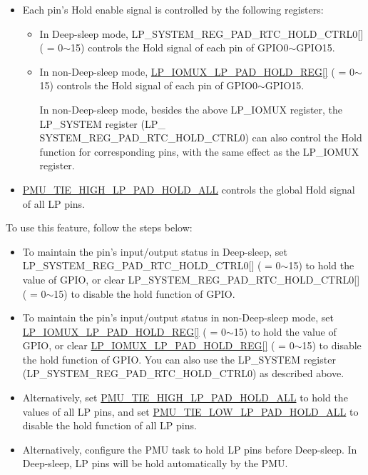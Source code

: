 \documentclass[main\_\_EN.tex]{subfiles}
\begin{document}
{\begin{itemize}
    \item Each pin's Hold enable signal is controlled by the following registers:
    \begin{itemize}
        \item In Deep-sleep mode, LP\_SYSTEM\_REG\_PAD\_RTC\_HOLD\_CTRL0[] ( = 0$\sim$15) controls the Hold signal of each pin of GPIO0$\sim$GPIO15.
        \item In non-Deep-sleep mode, \hyperref[regdesc:LPIOMUXLPPADHOLDREG]{LP\_IOMUX\_LP\_PAD\_HOLD\_REG[]} ( = 0$\sim$15) controls the Hold signal of each pin of GPIO0$\sim$GPIO15.
        \begin{tiplisting}
            In non-Deep-sleep mode, besides the above LP\_IOMUX register, the LP\_SYSTEM register (LP\_\\SYSTEM\_REG\_PAD\_RTC\_HOLD\_CTRL0) can also control the Hold function for corresponding pins, with the same effect as the LP\_IOMUX register.
        \end{tiplisting}
    \end{itemize}
    \item \hyperref[fielddesc:PMUTIEHIGHLPPADHOLDALL]{PMU\_TIE\_HIGH\_LP\_PAD\_HOLD\_ALL} controls the global Hold signal of all LP pins.
\end{itemize}

To use this feature, follow the steps below:

    \begin{itemize}
        \item To maintain the pin's input/output status in Deep-sleep, set LP\_SYSTEM\_REG\_PAD\_RTC\_HOLD\_CTRL0[] ( = 0$\sim$15) to hold the value of GPIO, or clear  LP\_SYSTEM\_REG\_PAD\_RTC\_HOLD\_CTRL0[] ( = 0$\sim$15) to disable the hold function of GPIO.
        \item To maintain the pin's input/output status in non-Deep-sleep mode, set \hyperref[regdesc:LPIOMUXLPPADHOLDREG]{LP\_IOMUX\_LP\_PAD\_HOLD\_REG[]} ( = 0$\sim$15) to hold the value of GPIO, or clear \hyperref[regdesc:LPIOMUXLPPADHOLDREG]{LP\_IOMUX\_LP\_PAD\_HOLD\_REG[]} ( = 0$\sim$15) to disable the hold function of GPIO. You can also use the LP\_SYSTEM register (LP\_SYSTEM\_REG\_PAD\_RTC\_HOLD\_CTRL0) as described above.
        \item Alternatively, set \hyperref[fielddesc:PMUTIEHIGHLPPADHOLDALL]{PMU\_TIE\_HIGH\_LP\_PAD\_HOLD\_ALL} to hold the values of all LP pins, and set \hyperref[fielddesc:PMUTIELOWLPPADHOLDALL]{PMU\_TIE\_LOW\_LP\_PAD\_HOLD\_ALL} to disable the hold function of all LP pins.
        \item Alternatively, configure the PMU task to hold LP pins before Deep-sleep. In Deep-sleep, LP pins will be hold automatically by the PMU.
    \end{itemize}
}{

}
\end{document}
